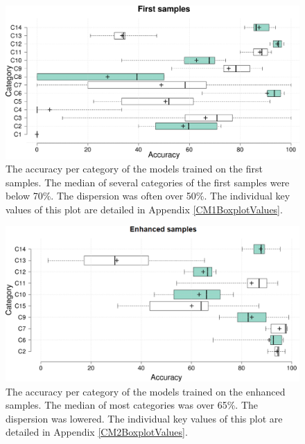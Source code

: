 \FloatBarrier

 \begin{figure}[]
    \centering
    \label{CM1Boxplot}
    \includegraphics[width =\textwidth]{Images/CM1Boxplot.png}
    \caption{The accuracy per category of the models trained on the first samples. The median of several categories of the first samples were below 70\%. The dispersion was often over 50\%. The individual key values of this plot are detailed in Appendix \ref{CM1BoxplotValues}.}
    \label{CM1Boxplot}
\end{figure}


 \begin{figure}[]
    \centering
    \includegraphics[width =\textwidth]{Images/CM2Boxplot.png}
    \caption{The accuracy per category of the models trained on the enhanced samples. The median of most categories was over 65\%. The dispersion was lowered. The individual key values of this plot are detailed in Appendix \ref{CM2BoxplotValues}.}
    \label{CM2Boxplot}
\end{figure}

